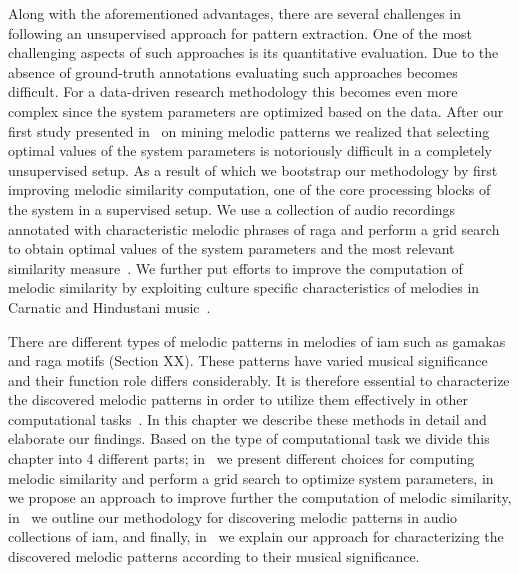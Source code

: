 Along with the aforementioned advantages, there are several challenges in following an unsupervised approach for pattern extraction. One of the most challenging aspects of such approaches is its quantitative evaluation. Due to the absence of ground-truth annotations evaluating such approaches becomes difficult. For a data-driven research methodology this becomes even more complex since the system parameters are optimized based on the data. After our first study presented in~\cite{gulati_SITIS_2014} on mining melodic patterns we realized that selecting optimal values of the system parameters is notoriously difficult in a completely unsupervised setup. As a result of which we bootstrap our methodology by first improving melodic similarity computation, one of the core processing blocks of the system in a supervised setup. We use a collection of audio recordings annotated with characteristic melodic phrases of \gls{raga} and perform a grid search to obtain optimal values of the system parameters and the most relevant similarity measure~\citep{gulati_ICASSP2015}. We further put efforts to improve the computation of melodic similarity by exploiting culture specific characteristics of melodies in Carnatic and Hindustani music~\citep{gulati_ISMIR_2015}.

There are different types of melodic patterns in melodies of \gls{iam} such as gamakas and \gls{raga} motifs (Section XX). These patterns have varied musical significance and their function role differs considerably. It is therefore essential to characterize the discovered melodic patterns in order to utilize them effectively in other computational tasks~\citep{gulati_communities_2016}. In this chapter we describe these methods in detail and elaborate our findings. Based on the type of computational task we divide this chapter into 4 different parts; in~ we present different choices for computing melodic similarity and perform a grid search to optimize system parameters, in~ we propose an approach to improve further the computation of melodic similarity, in~ we outline our methodology for discovering melodic patterns in audio collections of \gls{iam}, and finally, in~ we explain our approach for characterizing the discovered melodic patterns according to their musical significance. 

 

